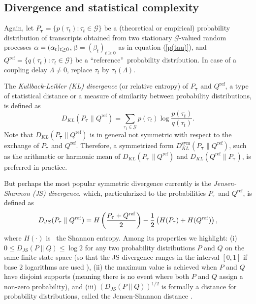 \documentclass[%
 aip,
 amsmath,amssymb,
 reprint,%
]{revtex4-1}
\begin{document}

\subsection{Divergence and statistical complexity}

\label{sec52}

Again, let $P_{\mathbf{\tau }}=\{p(\tau _{t}):\tau _{t}\in \mathcal{G}\}$ be
a (theoretical or empirical) probability distribution of transcripts
obtained from two stationary $\mathcal{G}$-valued random processes $\mathrm{%
\alpha }=(\alpha _{t})_{t\geq 0}$, $\mathrm{\beta }=(\beta _{t})_{t\geq 0}$
as in equation (\ref{p(tau)}), and $Q^{\mathrm{ref}}=\{q(\tau _{t}):\tau
_{t}\in \mathcal{G}\}$ be a \textquotedblleft reference\textquotedblright\
probability distribution. In case of a coupling delay $\Lambda \neq 0$,
replace $\tau _{t}$ by $\tau _{t}(\Lambda )$.

The \textit{Kullback-Leibler} \textit{(KL)} \textit{divergence} (or relative
entropy) of $P_{\mathbf{\tau }}$ and $Q^{\mathrm{ref}}$, a type of
statistical distance or a measure of similarity between probability
distributions, is defined as%
\begin{equation}
D_{KL}(P_{\mathbf{\tau }}\parallel Q^{\mathrm{ref}})=\sum_{\tau _{t}\in 
\mathcal{G}}p(\tau _{t})\log \frac{p(\tau _{t})}{q(\tau _{t})}.  \label{D_KL}
\end{equation}%
Note that $D_{KL}(P_{\mathbf{\tau }}\parallel Q^{\mathrm{ref}})$ is in
general not symmetric with respect to the exchange of $P_{\mathbf{\tau }}$
and $Q^{\mathrm{ref}}$. Therefore, a symmetrized form $D_{KL}^{\mathrm{sym}%
}(P_{\mathbf{\tau }}\parallel Q^{\mathrm{ref}})$, such as the arithmetic or
harmonic mean of $D_{KL}(P_{\mathbf{\tau }}\parallel Q^{\mathrm{ref}})$ and $%
D_{KL}(Q^{\mathrm{ref}}\parallel P_{\mathbf{\tau }})$, is preferred in practice.

But perhaps the most popular symmetric divergence currently is the \textit{%
Jensen-Shannon (JS) divergence}, which, particularized to the probabilities $%
P_{\mathbf{\tau }}$ and $Q^{\mathrm{ref}}$, is defined as 
\begin{equation}
D_{JS}(P_{\mathbf{\tau }}\parallel Q^{\mathrm{ref}})=H\left( \frac{P_{%
\mathbf{\tau }}+Q^{\mathrm{ref}}}{2}\right) -\frac{1}{2}\left( H(P_{\mathbf{%
\tau }})+H(Q^{\mathrm{ref}})\right) ,  \label{D_JS}
\end{equation}%
where $H(\cdot )$ is \ the Shannon entropy. Among its properties we
highlight: (i) $0\leq D_{JS}(P\parallel Q)\leq \log 2$ for any two
probability distributions $P$ and $Q$ on the same finite state space (so
that the JS divergence ranges in the interval $[0,1]$ if base $2$ logarithms
are used \cite{Lin1991}), (ii) the maximum value is achieved when $P$ and $Q$
have disjoint supports (meaning there is no event where both $P$ and $Q$
assign a non-zero probability), and (iii) $\left( D_{JS}(P\parallel
Q)\right) ^{1/2}$ is formally a distance for probability distributions,
called the Jensen-Shannon distance \cite{Endres2003}.
\end{document}
